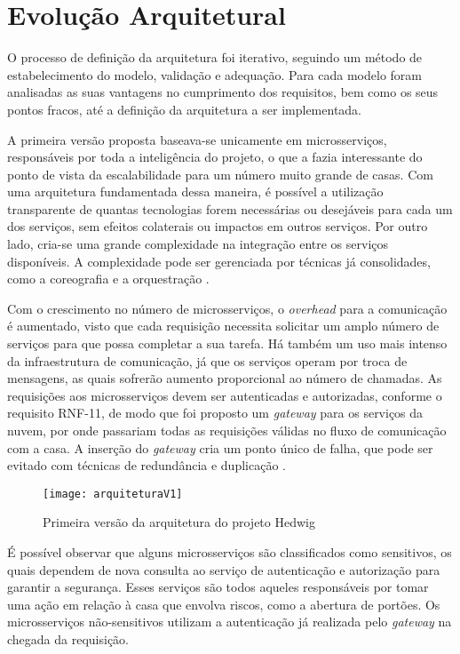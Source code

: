 \section{Evolução Arquitetural}
O processo de definição da arquitetura foi iterativo, seguindo um método de estabelecimento do modelo, validação e adequação. Para cada modelo foram analisadas as suas vantagens no cumprimento dos requisitos, bem como os seus pontos fracos, até a definição da arquitetura a ser implementada.

A primeira versão proposta baseava-se unicamente em microsserviços, responsáveis por toda a inteligência do projeto, o que a fazia interessante do ponto de vista da escalabilidade para um número muito grande de casas. Com uma arquitetura fundamentada dessa maneira, é possível a utilização transparente de quantas tecnologias forem necessárias ou desejáveis para cada um dos serviços, sem efeitos colaterais ou impactos em outros serviços. Por outro lado, cria-se uma grande complexidade na integração entre os serviços disponíveis. A complexidade pode ser gerenciada por técnicas já consolidades, como a coreografia e a orquestração \cite{lewis}.

Com o crescimento no número de microsserviços, o \emph{overhead} para a comunicação é aumentado, visto que cada requisição necessita solicitar um amplo número de serviços para que possa completar a sua tarefa. Há também um uso mais intenso da infraestrutura de comunicação, já que os serviços operam por troca de mensagens, as quais sofrerão aumento proporcional ao número de chamadas. As requisições aos microsserviços devem ser autenticadas e autorizadas, conforme o requisito RNF-11, de modo que foi proposto um \emph{gateway} para os serviços da nuvem, por onde passariam todas as requisições válidas no fluxo de comunicação com a casa. A inserção do \emph{gateway} cria um ponto único de falha, que pode ser evitado com técnicas de redundância e duplicação \cite{oracleSPOF}.

\begin{figure}[H]
	\centering
	\caption{Primeira versão da arquitetura do projeto Hedwig}
  \texttt{[image: arquiteturaV1]}
\label{fig:arquiteturaV1}
\end{figure}

É possível observar que alguns microsserviços são classificados como sensitivos, os quais dependem de nova consulta ao serviço de autenticação e autorização para garantir a segurança. Esses serviços são todos aqueles responsáveis por tomar uma ação em relação à casa que envolva riscos, como a abertura de portões. Os microsserviços não-sensitivos utilizam a autenticação já realizada pelo \textit{gateway} na chegada da requisição.

